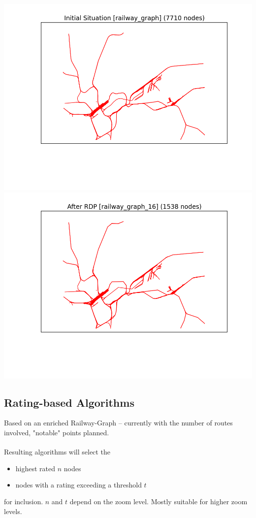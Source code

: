 \documentclass[twoside]{scrartcl}
\begin{document}
\includegraphics[scale=0.49]{rdprg-1.png}
\includegraphics[scale=0.49]{rdprg-2.png}

\subsection{Rating-based Algorithms}
Based on an enriched Railway-Graph -- currently with the number of routes
involved, "notable" points planned.\\\\
Resulting algorithms will select the
\begin{itemize}
\item highest rated \(n\) nodes
\item nodes with a rating exceeding a threshold \(t\)
\end{itemize}
for inclusion.
\(n\) and \(t\) depend on the zoom  level.
Mostly suitable for higher zoom levels.
\end{document}
